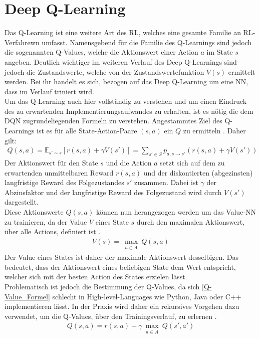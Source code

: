\section{Deep Q-Learning} \label{Q-Learning}
Das Q-Learning ist eine weitere Art des RL, welches eine gesamte Familie an RL-Verfahrewn umfasst. 
Namensgebend für die Familie des Q-Learnings sind jedoch die sogenannten Q-Values, welche die Aktionswert einer Action $a$ im State $s$ angeben. Deutlich wichtiger im weiteren Verlauf des Deep Q-Learnings sind jedoch die Zustandswerte, welche von der Zustandswertefunktion $V(s)$ ermittelt werden. Bei ihr handelt es sich, bezogen auf das Deep Q-Learning um eine NN, dass im Verlauf triniert wird.\\
Um das Q-Learning auch hier vollständig zu verstehen und um einen Eindruck des zu erwartenden Implementierungsaufwandes zu erhalten, ist es nötig die dem DQN zugrundeliegenden Formeln zu verstehen.
Angestammtes Ziel des Q-Learnings ist es für alle State-Action-Paare $(s,a)$ ein $Q$ zu ermitteln \cite{DRL}. Daher gilt:
\begin{align}
	\label{Q-Value_Formel}
	Q(s,a) = \mathbb{E}_{s'\sim s}[r(s,a) + \gamma V(s')] = \sum_{s' \in S}^{}p_{a,s \to s'}(r(s,a) + \gamma V(s'))
\end{align}
Der Aktionswert für den State $s$ und die Action $a$ setzt sich auf dem zu erwartenden unmittelbaren Reward $r(s,a)$ und der diskontierten (abgezinsten) langfristige Reward des Folgezustandes $s'$ zusammen. Dabei ist $\gamma$ der Abzinsfaktor und der langfristige Reward des Folgezustand wird durch $V(s')$ dargestellt.\\
Diese Aktionswerte $Q(s,a)$ können nun herangezogen werden um das Value-NN zu trainieren, da der Value $V$ eines State $s$ durch den maximalen Aktionswert, über alle Actions, definiert ist \cite{DRL}.
\begin{align}
	V(s) = \max_{\substack{a \in A}}Q(s,a)
\end{align}
Der Value eines States ist daher der maximale Aktionswert desselbigen. Das bedeutet, dass der Aktionswert eines beliebigen State dem Wert entspricht, welcher sich mit der besten Action des States erzielen lässt.\\
Problematisch ist jedoch die Bestimmung der Q-Values, da sich \ref{Q-Value_Formel} schlecht in High-level-Languages wie Python, Java oder C++ implementieren lässt. In der Praxis wird daher ein rekursives Vorgehen dazu verwendet, um die Q-Values, über den Trainingsverlauf, zu erlernen \cite{DRL}.
 \begin{align}
 	\label{Q-Value_Formel_r}
 	Q(s,a) = r(s,a) + \gamma \max_{\substack{a \in A}}Q(s',a')
 \end{align}
